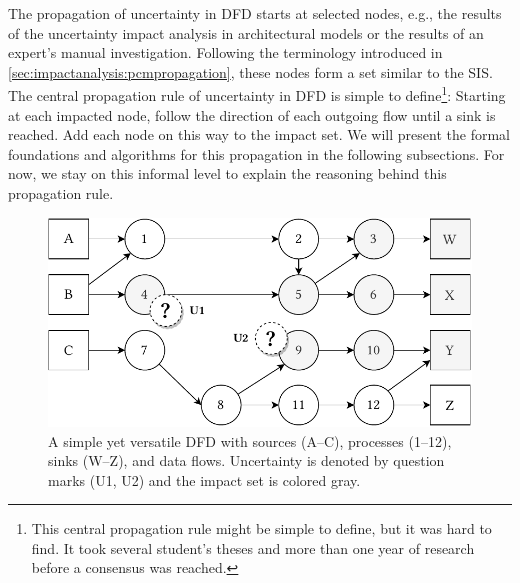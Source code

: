 The propagation of uncertainty in \ac{DFD} starts at selected nodes, e.g., the results of the uncertainty impact analysis in architectural models or the results of an expert's manual investigation.
Following the terminology introduced in \autoref{sec:impactanalysis:pcmpropagation}, these nodes form a set similar to the \ac{SIS}.
The central propagation rule of uncertainty in \ac{DFD} is simple to define\footnote{This central propagation rule might be simple to define, but it was hard to find. It took several student's theses \cite{benkler_architecture-based_2022,priss_mobility_2022,boltz_architectural_2021,stengel_verfeinerung_2021} and more than one year of research before a consensus was reached.}: Starting at each impacted node, follow the direction of each outgoing flow until a sink is reached.
Add each node on this way to the impact set.
We will present the formal foundations and algorithms for this propagation in the following subsections.
For now, we stay on this informal level to explain the reasoning behind this propagation rule.

\begin{figure}
    \centering
    \includegraphics[width=0.8\linewidth]{figures/chapter6/dfd-simple-propagation.pdf}
    \caption{A simple yet versatile \acf*{DFD} with sources (A--C), processes (1--12), sinks (W--Z), and data flows. Uncertainty is denoted by question marks (U1, U2) and the impact set is colored gray.}
    \label{fig:impactanalysis:dfdpropagation:simple}
\end{figure}


